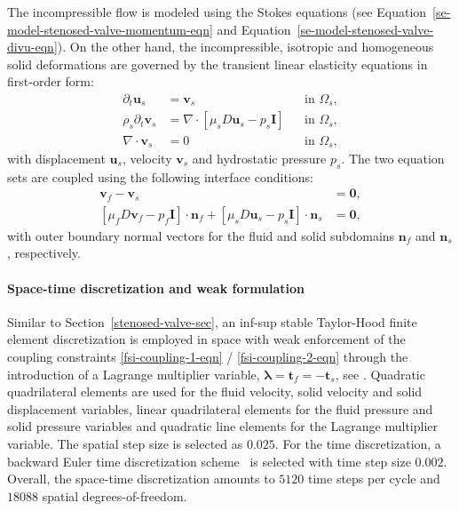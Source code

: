 \documentclass[3p]{elsarticle}
\begin{document}
The incompressible flow is modeled using the Stokes equations
(see Equation~\eqref{se-model-stenosed-valve-momentum-eqn}
and Equation~\eqref{se-model-stenosed-valve-divu-eqn}).
On the other hand, the incompressible, isotropic and homogeneous solid deformations are governed
by the transient linear elasticity equations in first-order form:
\begin{align}
	\partial_t \boldsymbol{u}_s &= \boldsymbol{v}_s && \text{in } \Omega_s, \label{linelas-dtu-v-eqn} \\
	\rho_s \partial_t \boldsymbol{v}_s
    &= \nabla \cdot \left[ \mu_s D \boldsymbol{u}_s - p_s \boldsymbol{I} \right] && \text{in } \Omega_s, \label{linelas-continuous-dtv-divsigma-eqn} \\
	\nabla \cdot \boldsymbol{v}_s &= 0 && \text{in } \Omega_s,
\end{align}
with displacement $\boldsymbol{u}_s$, velocity $\boldsymbol{v}_s$ and hydrostatic pressure $p_s$.
The two equation sets are coupled using the following interface conditions:
\begin{align}
    \boldsymbol{v}_f - \boldsymbol{v}_s &= \boldsymbol{0}, \label{fsi-coupling-1-eqn} \\
    \left[ \mu_f D \boldsymbol{v}_f - p_f \boldsymbol{I} \right] \cdot \boldsymbol{n}_f
    + \left[ \mu_s D \boldsymbol{u}_s - p_s \boldsymbol{I} \right] \cdot \boldsymbol{n}_s
    &= \boldsymbol{0}, \label{fsi-coupling-2-eqn}
\end{align}
with outer boundary normal vectors for the fluid and solid subdomains
$\boldsymbol{n}_f$ and $\boldsymbol{n}_s$, respectively.
\paragraph{Space-time discretization and weak formulation}
Similar to Section~\ref{stenosed-valve-sec},
an inf-sup stable Taylor-Hood finite element discretization is employed in space
with weak enforcement of the coupling constraints
\eqref{fsi-coupling-1-eqn} / \eqref{fsi-coupling-2-eqn}
through the introduction of a Lagrange multiplier variable,
$\boldsymbol{\lambda} = \boldsymbol{t}_f = - \boldsymbol{t}_s$,
see \cite{NordslettenKaySmith2010}.
Quadratic quadrilateral elements are used for the fluid velocity, solid velocity and solid displacement variables,
linear quadrilateral elements for the fluid pressure and solid pressure variables
and quadratic line elements for the Lagrange multiplier variable.
The spatial step size is selected as $0.025$.
For the time discretization, a backward Euler time discretization
scheme~\cite{HessenthalerNordslettenRoehrleSchroderFalgout2018}
is selected with time step size $0.002$.
Overall, the space-time discretization amounts to $5120$ time steps per cycle
and $18088$ spatial degrees-of-freedom.
\end{document}
